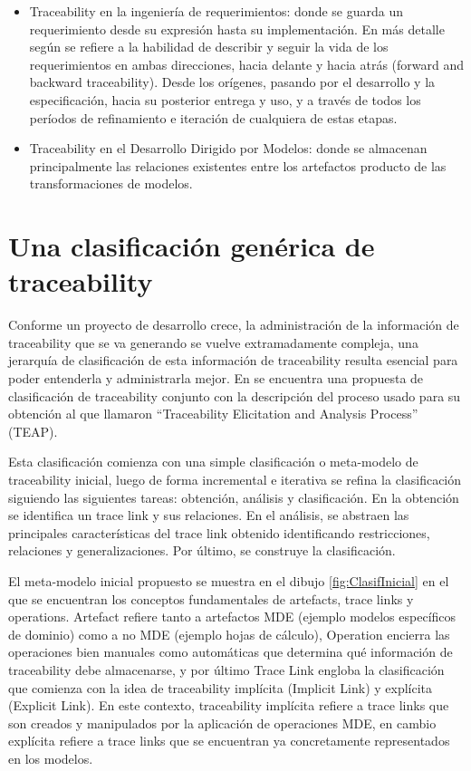 \documentclass[a4paper,12pt,oneside]{book}
\begin{document}
\begin{itemize}

\item Traceability en la ingeniería de requerimientos: donde se guarda un requerimiento desde su expresión hasta su implementación. En más detalle según \cite{GotelFinkelstein} se refiere a la habilidad de describir y seguir la vida de los requerimientos en ambas direcciones, hacia delante y hacia atrás (forward and backward traceability). Desde los orígenes, pasando por el desarrollo y la especificación, hacia su posterior entrega y uso, y a través de todos los períodos de refinamiento e iteración de cualquiera de estas etapas.

\item Traceability en el Desarrollo Dirigido por Modelos: donde se almacenan principalmente las relaciones existentes entre los artefactos producto de las transformaciones de modelos.

\end{itemize}

\section{Una clasificación genérica de traceability}

Conforme un proyecto de desarrollo crece, la administración de la información de traceability que se va generando se vuelve extramadamente compleja, una jerarquía de clasificación de esta información de traceability resulta esencial para poder entenderla y administrarla mejor. En \cite{PaigeOlsenKolovosZschalerPower} se encuentra una propuesta de clasificación de traceability conjunto con la descripción del proceso usado para su obtención al que llamaron ``Traceability Elicitation and Analysis Process'' (TEAP).

Esta clasificación comienza con una simple clasificación o meta-modelo de traceability inicial, luego de forma incremental e iterativa se refina la clasificación siguiendo las siguientes tareas: obtención, análisis y clasificación. En la obtención se identifica un trace link y sus relaciones. En el análisis, se abstraen las principales características del trace link obtenido identificando restricciones, relaciones y generalizaciones. Por último, se construye la clasificación.

El meta-modelo inicial propuesto se muestra en el dibujo \ref{fig:ClasifInicial} en el que se encuentran los conceptos fundamentales de artefacts, trace links y operations. Artefact refiere tanto a artefactos MDE (ejemplo modelos específicos de dominio) como a no MDE (ejemplo hojas de cálculo), Operation encierra las operaciones bien manuales como automáticas que determina qué información de traceability debe almacenarse, y por último Trace Link engloba la clasificación que comienza con la idea de traceability implícita (Implicit Link) y explícita (Explicit Link). En este contexto, traceability implícita refiere a trace links que son creados y manipulados por la aplicación de operaciones MDE, en cambio explícita refiere a trace links que se encuentran ya concretamente representados en los modelos.
\end{document}
